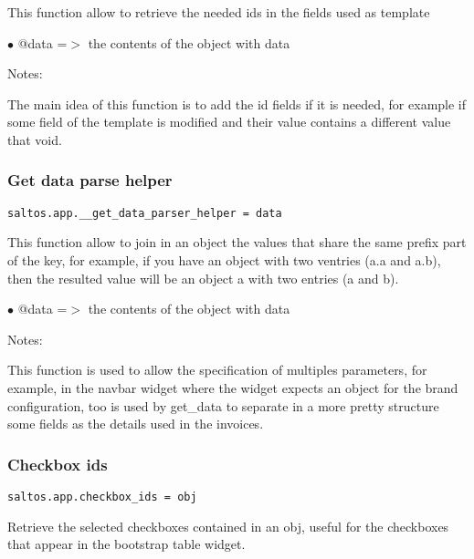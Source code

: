 \documentclass[a4paper]{article}
\begin{document}
This function allow to retrieve the needed ids in the fields used as template

\begin{compactitem}
\item[\color{myblue}$\bullet$] @data =$>$ the contents of the object with data
\end{compactitem}

Notes:

The main idea of this function is to add the id fields if it is needed, for example
if some field of the template is modified and their value contains a different value
that void.

\hypertarget{toc573}{}
\subsubsection{Get data parse helper}

\begin{lstlisting}
saltos.app.__get_data_parser_helper = data
\end{lstlisting}

This function allow to join in an object the values that share the same prefix part of
the key, for example, if you have an object with two ventries (a.a and a.b), then the
resulted value will be an object a with two entries (a and b).

\begin{compactitem}
\item[\color{myblue}$\bullet$] @data =$>$ the contents of the object with data
\end{compactitem}

Notes:

This function is used to allow the specification of multiples parameters, for example,
in the navbar widget where the widget expects an object for the brand configuration, too
is used by get\_data to separate in a more pretty structure some fields as the details used
in the invoices.

\hypertarget{toc574}{}
\subsubsection{Checkbox ids}

\begin{lstlisting}
saltos.app.checkbox_ids = obj
\end{lstlisting}

Retrieve the selected checkboxes contained in an obj, useful for the checkboxes
that appear in the bootstrap table widget.
\end{document}
